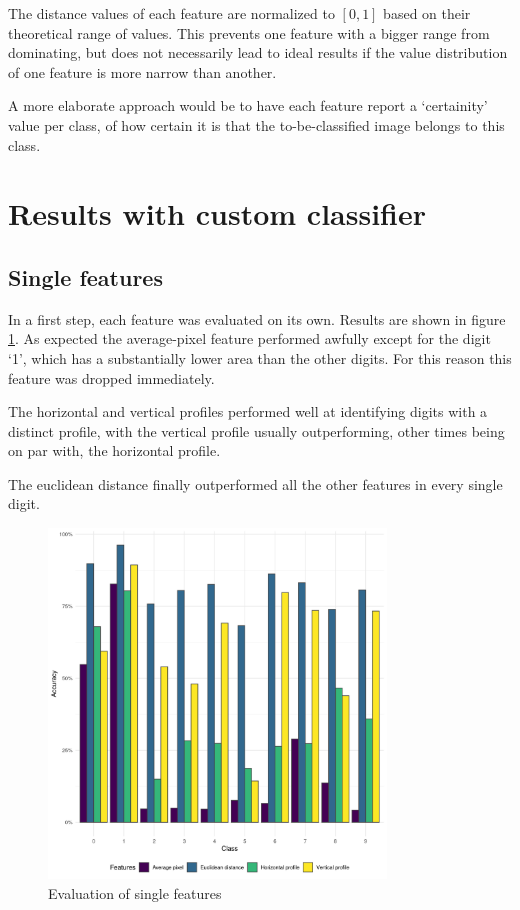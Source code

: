 \documentclass[a4paper]{scrreprt}
\begin{document}
The distance values of each feature are normalized to $[0, 1]$ based on their
theoretical range of values. This prevents one feature with a bigger range from
dominating, but does not necessarily lead to ideal results if the value
distribution of one feature is more narrow than another.

A more elaborate approach would be to have each feature report a `certainity'
value per class, of how certain it is that the to-be-classified image belongs
to this class.

\section{Results with custom classifier}

\subsection{Single features}

In a first step, each feature was evaluated on its own. Results are shown in
figure \ref{fig:evaluation_single}. As expected the average-pixel feature
performed awfully except for the digit `1', which has a substantially lower
area than the other digits. For this reason this feature was dropped
immediately.

The horizontal and vertical profiles performed well at identifying digits with
a distinct profile, with the vertical profile usually outperforming, other
times being on par with, the horizontal profile.

The euclidean distance finally outperformed all the other features in every
single digit.

\begin{figure}[h]
        \centering
		\includegraphics[width=0.8\textwidth]{../resources/features_single.png}
		\caption{Evaluation of single features}
		\label{fig:evaluation_single}
\end{figure}
\end{document}
